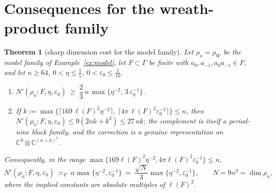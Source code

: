 \documentclass[11pt]{amsart}
\newtheorem{theorem}{Theorem}[section]
\theoremstyle{definition}
\theoremstyle{remark}
\newcommand{\C}{\mathbb C}
\newcommand{\lamp}{a}
\begin{document}
\section{Consequences for the wreath-product family}\label{sec:wreath}

\begin{theorem}[sharp dimension cost for the model family]\label{thm:wreath}
Let $\rho_n=\rho_W$ be the model family of Example~\ref{ex:model}, let $F\subset\Gamma$ be finite with $\lamp_0,\lamp_{-1},\lamp_0\lamp_{-1}\in F$, and let $n\ge64$, $0<\eta\le\frac15$, $0<\varepsilon_0\le\frac1{10}$.
\begin{enumerate}[label=\textup{(\alph*)},leftmargin=2.5em]
\item $N'(\rho_n;F,\eta,\varepsilon_0)\ \ge\ \dfrac23\,n\,\max\bigl\{\eta^{-2},\,3\,\varepsilon_0^{-1}\bigr\}$.
\item If $k:=\max\bigl\{\lceil169\,\ell(F)^2\eta^{-2}\rceil,\ \lceil4\pi\,\ell(F)^2\varepsilon_0^{-1}\rceil\bigr\}\le n$, then $N'(\rho_n;F,\eta,\varepsilon_0)\le9(2nk+k^2)\le27\,nk$; the complement is itself a period-nine block family, and the correction is a genuine representation on $\C^9\otimes\C^{(n+k)^2}$.
\end{enumerate}
Consequently, in the range $\max\{169\ell(F)^2\eta^{-2},4\pi\ell(F)^2\varepsilon_0^{-1}\}\le n$,
\[
N'(\rho_n;F,\eta,\varepsilon_0)\ \asymp_F\ n\max\{\eta^{-2},\varepsilon_0^{-1}\}\ =\ \frac{\sqrt N}{3}\max\{\eta^{-2},\varepsilon_0^{-1}\},\qquad N=9n^2=\dim\rho_n,
\]
where the implied constants are absolute multiples of $\ell(F)^2$.
\end{theorem}
\end{document}
